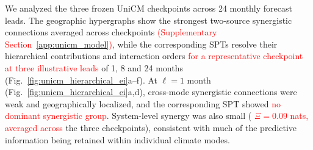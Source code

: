 \documentclass[fleqn,10pt]{wlscirep}
\newcommand{\rev}[1]{\textcolor{red}{#1}}
\theoremstyle{naturetheorem}
\begin{document}
We analyzed the three frozen UniCM checkpoints across 24 monthly forecast leads. The geographic hypergraphs show the strongest two-source synergistic connections averaged across checkpoints %
\rev{(Supplementary Section~\ref{app:unicm_model})}, while the corresponding SPTs resolve their hierarchical contributions and interaction orders %
\rev{for a representative checkpoint at three illustrative leads} of 1, 8 and 24 months (Fig.~\ref{fig:unicm_hierarchical_ei}a--f). At $\ell=1$ month (Fig.~\ref{fig:unicm_hierarchical_ei}a,d), cross-mode synergistic connections were weak and geographically localized, and the corresponding SPT showed %
\rev{no dominant synergistic group}. System-level synergy was also small (%
\rev{$\Xi=0.09$ nats, averaged across} the three checkpoints), consistent with much of the predictive information being retained within individual climate modes.
\end{document}

